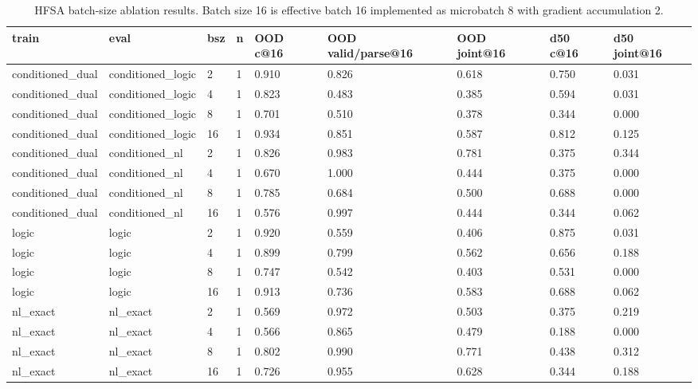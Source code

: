 \documentclass[10pt]{article}
\begin{document}
\begin{table}[H]
\centering
\scriptsize
\begin{tabular}{lllllllll}
\toprule
train & eval & bsz & n & OOD c@16 & OOD valid/parse@16 & OOD joint@16 & d50 c@16 & d50 joint@16 \\
\midrule
conditioned\_dual & conditioned\_logic & 2 & 1 & 0.910 & 0.826 & 0.618 & 0.750 & 0.031 \\
conditioned\_dual & conditioned\_logic & 4 & 1 & 0.823 & 0.483 & 0.385 & 0.594 & 0.031 \\
conditioned\_dual & conditioned\_logic & 8 & 1 & 0.701 & 0.510 & 0.378 & 0.344 & 0.000 \\
conditioned\_dual & conditioned\_logic & 16 & 1 & 0.934 & 0.851 & 0.587 & 0.812 & 0.125 \\
conditioned\_dual & conditioned\_nl & 2 & 1 & 0.826 & 0.983 & 0.781 & 0.375 & 0.344 \\
conditioned\_dual & conditioned\_nl & 4 & 1 & 0.670 & 1.000 & 0.444 & 0.375 & 0.000 \\
conditioned\_dual & conditioned\_nl & 8 & 1 & 0.785 & 0.684 & 0.500 & 0.688 & 0.000 \\
conditioned\_dual & conditioned\_nl & 16 & 1 & 0.576 & 0.997 & 0.444 & 0.344 & 0.062 \\
logic & logic & 2 & 1 & 0.920 & 0.559 & 0.406 & 0.875 & 0.031 \\
logic & logic & 4 & 1 & 0.899 & 0.799 & 0.562 & 0.656 & 0.188 \\
logic & logic & 8 & 1 & 0.747 & 0.542 & 0.403 & 0.531 & 0.000 \\
logic & logic & 16 & 1 & 0.913 & 0.736 & 0.583 & 0.688 & 0.062 \\
nl\_exact & nl\_exact & 2 & 1 & 0.569 & 0.972 & 0.503 & 0.375 & 0.219 \\
nl\_exact & nl\_exact & 4 & 1 & 0.566 & 0.865 & 0.479 & 0.188 & 0.000 \\
nl\_exact & nl\_exact & 8 & 1 & 0.802 & 0.990 & 0.771 & 0.438 & 0.312 \\
nl\_exact & nl\_exact & 16 & 1 & 0.726 & 0.955 & 0.628 & 0.344 & 0.188 \\
\bottomrule
\end{tabular}
\caption{HFSA batch-size ablation results. Batch size 16 is effective batch 16 implemented as microbatch 8 with gradient accumulation 2.}
\end{table}
\end{document}
